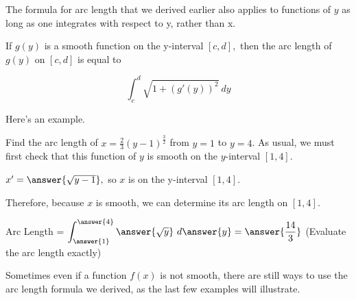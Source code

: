 \documentclass[handout,nooutcomes]{ximera}
\begin{document}
The formula for arc length that we derived earlier also applies to functions of $y$ as long as one integrates with respect to y, rather than x.  

\begin{theorem}
If $g(y)$ is a smooth function on the y-interval $[c,d],$ then the arc length of $g(y)$ on $[c,d]$ is equal to 

$$\displaystyle\int_{c}^{d} \sqrt{1+(g'(y))^2} \ dy$$

\end{theorem}

Here's an example.  


\begin{problem}
Find the arc length of $x = \frac{2}{3} (y-1)^{\frac{3}{2}}$ from $y=1$ to $y=4$.  As usual, we must first check that this function of $y$ is smooth on the $y$-interval $[1,4]$.  

$x' = \answer{\sqrt{y-1}},$ so $x$ is  on the y-interval $[1,4]$.

\begin{problem}
Therefore, because $x$ is smooth, we can determine its arc length on $[1,4]$.

Arc Length = $\displaystyle\int_{\answer{1}}^{\answer{4}} \answer{\sqrt{y}} \ d\answer{y} = \answer{\frac{14}{3}}$ (Evaluate the arc length exactly)

\end{problem}

\end{problem}

Sometimes even if a function $f(x)$ is not smooth, there are still ways to use the arc length formula we derived, as the last few examples will illustrate.

\end{document}
